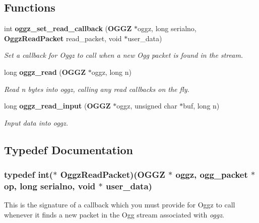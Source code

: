 \subsection*{Functions}
\begin{CompactItemize}
\item 
int {\bf oggz\_\-set\_\-read\_\-callback} ({\bf OGGZ} $\ast$oggz, long serialno, {\bf Oggz\-Read\-Packet} read\_\-packet, void $\ast$user\_\-data)
\begin{CompactList}\small\item\em Set a callback for Oggz to call when a new Ogg packet is found in the stream. \item\end{CompactList}\item 
long {\bf oggz\_\-read} ({\bf OGGZ} $\ast$oggz, long n)
\begin{CompactList}\small\item\em Read n bytes into {\em oggz\/}, calling any read callbacks on the fly. \item\end{CompactList}\item 
long {\bf oggz\_\-read\_\-input} ({\bf OGGZ} $\ast$oggz, unsigned char $\ast$buf, long n)
\begin{CompactList}\small\item\em Input data into {\em oggz\/}. \item\end{CompactList}\end{CompactItemize}


\subsection{Typedef Documentation}
\subsubsection{\setlength{\rightskip}{0pt plus 5cm}typedef int($\ast$ {\bf Oggz\-Read\-Packet})({\bf OGGZ} $\ast$ oggz, ogg\_\-packet $\ast$ op, long serialno, void $\ast$ user\_\-data)}\label{group__read__api_ga0}


This is the signature of a callback which you must provide for Oggz to call whenever it finds a new packet in the Ogg stream associated with {\em oggz\/}. 

